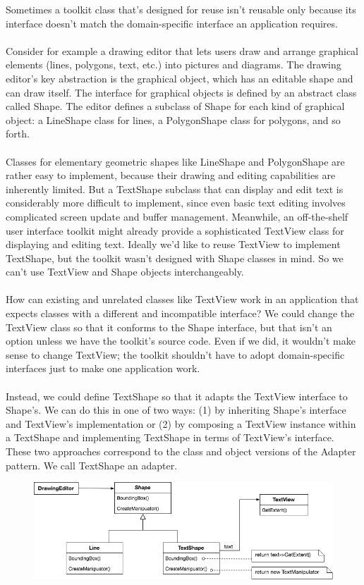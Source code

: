 Sometimes a toolkit class that's designed for reuse isn't reusable only because its interface doesn't match the domain-specific interface an application requires.
\\\\
Consider for example a drawing editor that lets users draw and arrange graphical elements (lines, polygons, text, etc.) into pictures and diagrams. The drawing editor's key abstraction is the graphical object, which has an editable shape and can draw itself. The interface for graphical objects is defined by an abstract class called Shape. The editor defines a subclass of Shape for each kind of graphical object: a LineShape class for lines, a PolygonShape class for polygons, and so forth.
\\\\
Classes for elementary geometric shapes like LineShape and PolygonShape are rather easy to implement, because their drawing and editing capabilities are inherently limited. But a TextShape subclass that can display and edit text is considerably more difficult to implement, since even basic text editing involves complicated screen update and buffer management. Meanwhile, an off-the-shelf user interface toolkit might already provide a sophisticated TextView class for displaying and editing text. Ideally we'd like to reuse TextView to implement TextShape, but the toolkit wasn't designed with Shape classes in mind. So we can't use TextView and Shape objects interchangeably.
\\\\
How can existing and unrelated classes like TextView work in an application that expects classes with a different and incompatible interface? We could change the TextView class so that it conforms to the Shape interface, but that isn't an option unless we have the toolkit's source code. Even if we did, it wouldn't make sense to change TextView; the toolkit shouldn't have to adopt domain-specific interfaces just to make one application work.
\\\\
Instead, we could define TextShape so that it adapts the TextView interface to Shape's. We can do this in one of two ways: (1) by inheriting Shape's interface and TextView's implementation or (2) by composing a TextView instance within a TextShape and implementing TextShape in terms of TextView's interface. These two approaches correspond to the class and object versions of the Adapter pattern. We call TextShape an adapter.

\begin{figure}[H]
\centering
\includegraphics[scale=0.5]{diagrams/adapter_motivation.png}
\end{figure}

